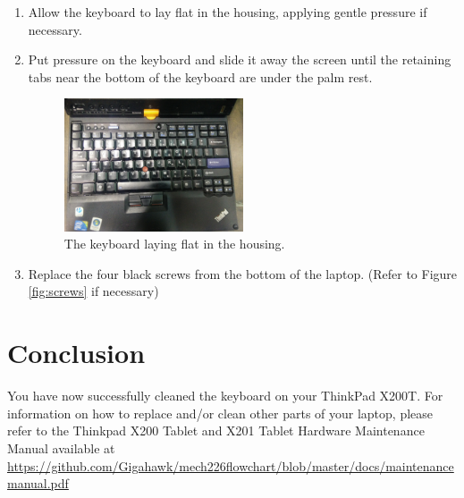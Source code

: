 \documentclass{article}
\begin{document}
\begin{enumerate}
	\item Allow the keyboard to lay flat in the housing, applying gentle pressure if necessary.
	\item Put pressure on the keyboard and slide it away the screen until the retaining tabs near the bottom of the keyboard are under the palm rest.
	\begin{figure}[H]
		\centering
		\includegraphics[width=0.5\textwidth]{keyboardlayflat.jpg}
		\caption{The keyboard laying flat in the housing.}
		\label{fig:angleinsert}
	\end{figure}

	\item Replace the four black screws from the bottom of the laptop. (Refer to Figure \ref{fig:screws} if necessary)

\end{enumerate}

\section*{Conclusion}
You have now successfully cleaned the keyboard on your ThinkPad X200T.
For information on how to replace and/or clean other parts of your laptop, please refer to the Thinkpad X200 Tablet and X201 Tablet Hardware Maintenance Manual available at \url{https://github.com/Gigahawk/mech226flowchart/blob/master/docs/maintenancemanual.pdf}
\end{document}
